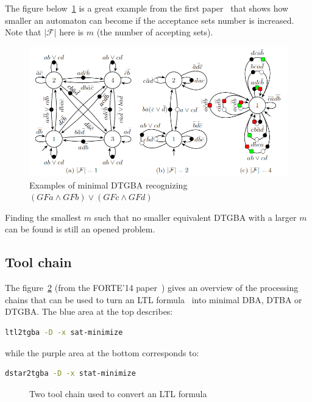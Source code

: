 \noindent The figure below~\ref{fig:accsets} is a great example from the first paper~\cite{14} that shows how
smaller an automaton can become if the acceptance sets number is increased. Note that $|\mathcal{F}|$ here
is $m$ (the number of accepting sets).
\begin{figure}[H]
 \centering
 \includegraphics[scale=0.5]{img/accsets_reduction.png}
 \caption{Examples of minimal DTGBA recognizing $(GFa \land GFb) \lor (GFc \land GFd)$}
 \label{fig:accsets}
\end{figure}

Finding the smallest $m$ such that no smaller equivalent DTGBA with a larger $m$ can be found is
still an opened problem.

\subsection{Tool chain}
The figure~\ref{fig:tool_chain} (from the FORTE'14 paper~\cite{14}) gives an overview of the processing
chains that can be used to turn an LTL formula~\cite{13} into minimal DBA, DTBA or DTGBA.
The blue area at the top describes:
\begin{lstlisting}[language=bash,caption={bash command-line to translate a formula using ltl2tgba}]
  ltl2tgba -D -x sat-minimize
\end{lstlisting}

\noindent while the purple area at the bottom corresponds to:
\begin{lstlisting}[language=bash,caption={bash command-line to translate a formula using dstar2tgba}]
  dstar2tgba -D -x stat-minimize
\end{lstlisting}

\begin{figure}[H]
 \centering
 
 \caption{Two tool chain used to convert an LTL formula}
 \label{fig:tool_chain}
\end{figure}


